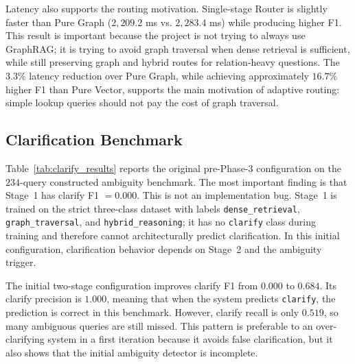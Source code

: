 \documentclass[11pt,twocolumn]{article}
\begin{document}
Latency also supports the routing motivation. Single-stage
Router is slightly faster than Pure Graph ($2{,}209.2$ ms vs.
$2{,}283.4$ ms) while producing higher F1. This result is
important because the project is not trying to always use
GraphRAG; it is trying to avoid graph traversal when dense
retrieval is sufficient, while still preserving graph and
hybrid routes for relation-heavy questions.
The $3.3\%$ latency reduction over Pure Graph, while achieving
approximately $16.7\%$ higher F1 than Pure Vector, supports
the main motivation of adaptive routing: simple lookup queries
should not pay the cost of graph traversal.

\subsection{Clarification Benchmark}
\label{subsec:clarify_results}

Table~\ref{tab:clarify_results} reports the original
pre-Phase-3 configuration on the $234$-query constructed
ambiguity benchmark. The most important finding is that
Stage~1 has clarify F1 $=0.000$. This is not an
implementation bug. Stage~1 is trained on the strict
three-class dataset with labels \texttt{dense\_retrieval},
\texttt{graph\_traversal}, and \texttt{hybrid\_reasoning};
it has no \texttt{clarify} class during training and
therefore cannot architecturally predict clarification. In
this initial configuration, clarification behavior depends on
Stage~2 and the ambiguity trigger.

\begin{table}[!htbp]
\centering
\caption{Original pre-Phase-3 clarification results on the constructed ambiguity benchmark.}
\label{tab:clarify_results}
\scriptsize
\setlength{\tabcolsep}{2.2pt}
\end{table}

The initial two-stage configuration improves clarify F1 from
$0.000$ to $0.684$. Its clarify precision is $1.000$, meaning
that when the system predicts \texttt{clarify}, the prediction
is correct in this benchmark. However, clarify recall is only
$0.519$, so many ambiguous queries are still missed. This
pattern is preferable to an over-clarifying system in a first
iteration because it avoids false clarification, but it also
shows that the initial ambiguity detector is incomplete.
\end{document}
